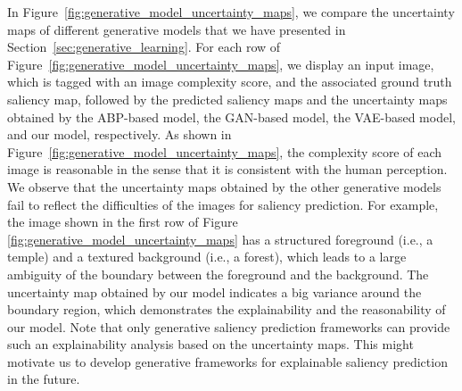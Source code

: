 \documentclass{article}
\begin{document}
In Figure~\ref{fig:generative_model_uncertainty_maps}, we compare the uncertainty maps of different generative models that we have presented in Section~\ref{sec:generative_learning}. For each row of Figure~\ref{fig:generative_model_uncertainty_maps}, we display an input image, which is tagged with an image complexity score, and the associated ground truth saliency map, followed by the predicted saliency maps and the uncertainty maps obtained by the ABP-based model, the GAN-based model, the VAE-based model, and our model, respectively. As shown in Figure~\ref{fig:generative_model_uncertainty_maps}, the complexity score of each image is reasonable in the sense that it is consistent with the human perception. We observe that the uncertainty maps obtained by the other generative models fail to reflect the difficulties of the images for saliency prediction. For example, the image shown in the first row of Figure \ref{fig:generative_model_uncertainty_maps} has a structured foreground (i.e., a temple) and a textured background (i.e., a forest), which leads to a large ambiguity of the boundary between the foreground and the background. The uncertainty map obtained by our model indicates a big variance around the boundary region, which demonstrates the explainability and the reasonability of our model. Note that only generative saliency prediction frameworks can provide such an explainability analysis based on the uncertainty maps. This might motivate us to develop generative frameworks for explainable saliency prediction in the future.        





  
\end{document}
